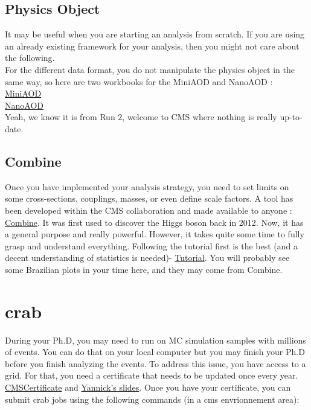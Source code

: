 \documentclass[reprint, a4paper, nofootinbib, amsmath, amssymb, aps]{revtex4-1}
\begin{document}
\subsection{Physics Object}
    It may be useful when you are starting an analysis from scratch. If you are using an already existing framework for your analysis, then you might not care about the following. \\
    For the different data format, you do not manipulate the physics object in the same way, so here are two workbooks for the MiniAOD and NanoAOD : \\
    \href{https://twiki.cern.ch/twiki/bin/view/CMSPublic/WorkBookMiniAOD2017}{MiniAOD}\\
    \href{https://twiki.cern.ch/twiki/bin/view/CMSPublic/WorkBookNanoAOD}{NanoAOD}\\
    Yeah, we know it is from Run 2, welcome to CMS where nothing is really up-to-date.



\subsection{Combine}


    Once you have implemented your analysis strategy, you need to set limits on some cross-sections, couplings, masses, or even define scale factors. A tool has been developed within the CMS collaboration and made available to anyone : \href{https://cms-analysis.github.io/HiggsAnalysis-CombinedLimit/latest/}{Combine}. It was first used to discover the Higgs boson back in 2012. Now, it  has a general purpose and really powerful. However, it takes quite some time to fully grasp and understand everything. Following the tutorial first is the best (and a decent understanding of statistics is needed)- \href{https://cms-analysis.github.io/HiggsAnalysis-CombinedLimit/latest/part5/longexercise/}{Tutorial}. You will probably see some Brazilian plots in your time here, and they may come from Combine.

\section{crab}

 During your Ph.D, you may need to run on MC simulation samples with millions of events. You can do that on your local computer but you may finish your Ph.D  before you finish analyzing the events. To address this issue, you have access to a grid. For that, you need a certificate that needs to be updated once every year. \href{https://twiki.cern.ch/twiki/bin/view/CMSPublic/WorkBookChapter5}{CMSCertificate} and \href{https://indico.in2p3.fr/event/32895/}{Yannick's slides}. Once you have your certificate, you can submit crab jobs using the following commands (in a cms envrionnement area): 
 
\end{document}
